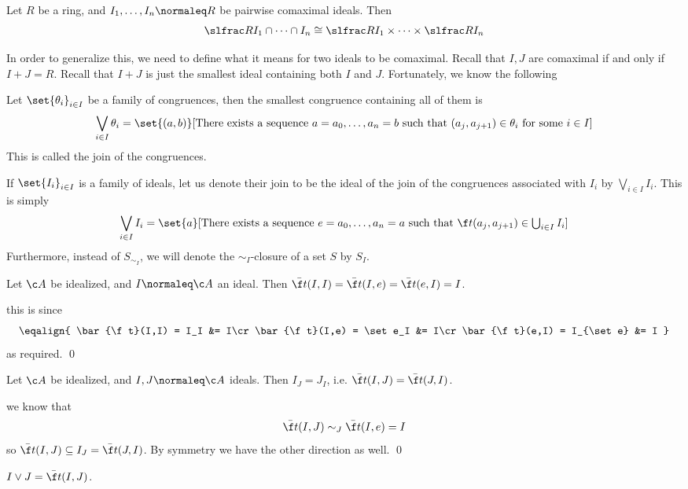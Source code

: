     Let $R$ be a ring, and $I_1,\dots,I_n\normaleq R$ be pairwise comaximal ideals.
    Then
    $$ \slfrac R{I_1\cap\cdots\cap I_n} \cong \slfrac R{I_1}\times\cdots\times\slfrac R{I_n} $$

\ethrm

In order to generalize this, we need to define what it means for two ideals to be comaximal.
Recall that $I,J$ are comaximal if and only if $I+J=R$.
Recall that $I+J$ is just the smallest ideal containing both $I$ and $J$.
Fortunately, we know the following

\blemm

    Let $\set{\theta_i}_{i\in I}$ be a family of congruences, then the smallest congruence containing all of them is
    $$ \bigvee_{i\in I}\theta_i = \set{(a,b)}[\hbox{There exists a sequence $a=a_0,\dots,a_n=b$ such that $(a_j,a_{j+1})\in\theta_i$ for some $i\in I$}] $$
    This is called the {\emphcolor join} of the congruences.

\elemm

If $\set{I_i}_{i\in I}$ is a family of ideals, let us denote their join to be the ideal of the join of the congruences associated with $I_i$ by $\bigvee_{i\in I}I_i$.
This is simply
$$ \bigvee_{i\in I}I_i = \set{a}[\hbox{There exists a sequence $e=a_0,\dots,a_n=a$ such that $\f t(a_j,a_{j+1})\in\bigcup_{i\in I}I_i$}] $$
Furthermore, instead of $S_{\sim_I}$, we will denote the $\sim_I$-closure of a set $S$ by $S_I$.

\blemm

    Let $\c A$ be idealized, and $I\normaleq\c A$ an ideal.
    Then $\bar{\f t}(I,I)=\bar{\f t}(I,e)=\bar{\f t}(e,I)=I$.

\elemm

\Proof this is since
$$ \eqalign{
    \bar{\f t}(I,I) = I_I &= I\cr
    \bar{\f t}(I,e) = \set e_I &= I\cr
    \bar{\f t}(e,I) = I_{\set e} &= I
} $$
as required.
\qed

\blemm

    Let $\c A$ be idealized, and $I,J\normaleq\c A$ ideals.
    Then $I_J=J_I$, i.e. $\bar{\f t}(I,J)=\bar{\f t}(J,I)$.

\elemm

\Proof we know that
$$ \bar{\f t}(I,J) \sim_J \bar{\f t}(I,e) = I $$
so $\bar{\f t}(I,J)\subseteq I_J = \bar{\f t}(J,I)$.
By symmetry we have the other direction as well.
\qed

\blemm

    $I\vee J=\bar{\f t}(I,J)$.

\elemm

